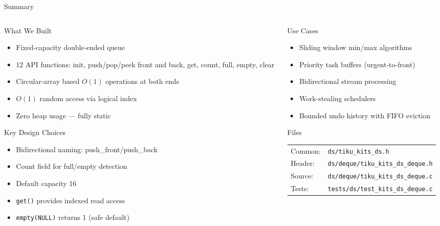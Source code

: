 \documentclass[aspectratio=169, 10pt]{beamer}
\begin{document}
\begin{frame}{Summary}
\begin{columns}[T]
\begin{column}{0.48\textwidth}
\begin{block}{What We Built}
\begin{itemize}
  \item Fixed-capacity double-ended queue
  \item 12 API functions: init, push/pop/peek front and back, get, count, full, empty, clear
  \item Circular-array based $O(1)$ operations at both ends
  \item $O(1)$ random access via logical index
  \item Zero heap usage --- fully static
\end{itemize}
\end{block}

\begin{block}{Key Design Choices}
\begin{itemize}
  \item Bidirectional naming: push\_front/push\_back
  \item Count field for full/empty detection
  \item Default capacity 16
  \item \texttt{get()} provides indexed read access
  \item \texttt{empty(NULL)} returns 1 (safe default)
\end{itemize}
\end{block}
\end{column}

\begin{column}{0.48\textwidth}
\begin{block}{Use Cases}
\begin{itemize}
  \item Sliding window min/max algorithms
  \item Priority task buffers (urgent-to-front)
  \item Bidirectional stream processing
  \item Work-stealing schedulers
  \item Bounded undo history with FIFO eviction
\end{itemize}
\end{block}

\begin{block}{Files}
\scriptsize
\begin{tabular}{@{}lp{4.5cm}@{}}
Common: & \texttt{ds/tiku\_kits\_ds.h} \\
Header: & \texttt{ds/deque/tiku\_kits\_ds\_deque.h} \\
Source: & \texttt{ds/deque/tiku\_kits\_ds\_deque.c} \\
Tests:  & \texttt{tests/ds/test\_kits\_ds\_deque.c} \\
\end{tabular}
\end{block}
\end{column}
\end{columns}
\end{frame}
\end{document}
